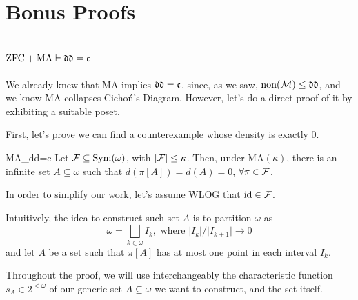 \chapter{Bonus Proofs}

\section{\texorpdfstring{$\text{ZFC}+\text{MA}\vdash\mathfrak{dd}=\mathfrak{c}$}{MA=>dd=c}}

We already knew that MA implies $\mathfrak{dd}=\mathfrak{c}$, since, as we saw, $\text{non}(\mathcal{M})\leq\mathfrak{dd}$, and we know MA collapses Cichoń's Diagram. However, let's do a direct proof of it by exhibiting a suitable poset.

First, let's prove we can find a counterexample whose density is exactly $0$.

\begin{theorem}{}{MA_dd=c}
    Let $\mathcal{F}\subseteq\mathrm{Sym}(\omega)$, with $\lvert\mathcal{F}\rvert\leq\kappa$. Then, under $\text{MA}(\kappa)$, there is an infinite set $A\subseteq\omega$ such that $d(\pi[A])=d(A)=0$, $\forall\pi\in\mathcal{F}$.
\end{theorem}

In order to simplify our work, let's assume WLOG that $\text{id}\in\mathcal{F}$.

Intuitively, the idea to construct such set $A$ is to partition $\omega$ as
$$\omega=\bigsqcup_{k\in\omega}I_k,\text{ where }\lvert I_k\rvert/\lvert I_{k+1}\rvert\to0$$
and let $A$ be a set such that $\pi[A]$ has at most one point in each interval $I_k$.

Throughout the proof, we will use interchangeably the characteristic function $s_A\in2^{<\omega}$ of our generic set $A\subseteq\omega$ we want to construct, and the set itself.

